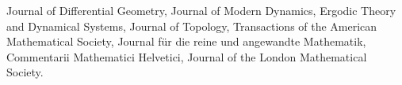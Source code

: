     \medskip

    Journal of Differential Geometry, Journal of Modern Dynamics, Ergodic Theory and Dynamical Systems, Journal of Topology, Transactions of the American Mathematical Society, Journal f\"ur die reine und angewandte Mathematik, Commentarii Mathematici Helvetici, Journal of the London Mathematical Society.